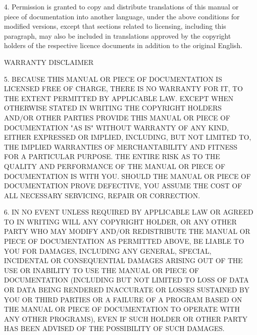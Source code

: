 4. Permission is granted to copy and distribute translations of this manual
or piece of documentation into another language, under the above conditions
for modified versions, except that sections related to licensing, including
this paragraph, may also be included in translations approved by the
copyright holders of the respective licence documents in addition to the
original English.

\begin{center}
WARRANTY DISCLAIMER
\end{center}

5. BECAUSE THIS MANUAL OR PIECE OF DOCUMENTATION IS LICENSED FREE OF
CHARGE, THERE IS NO WARRANTY FOR IT, TO THE EXTENT PERMITTED BY APPLICABLE
LAW.  EXCEPT WHEN OTHERWISE STATED IN WRITING THE COPYRIGHT HOLDERS AND/OR
OTHER PARTIES PROVIDE THIS MANUAL OR PIECE OF DOCUMENTATION "AS IS" WITHOUT
WARRANTY OF ANY KIND, EITHER EXPRESSED OR IMPLIED, INCLUDING, BUT NOT
LIMITED TO, THE IMPLIED WARRANTIES OF MERCHANTABILITY AND FITNESS FOR A
PARTICULAR PURPOSE.  THE ENTIRE RISK AS TO THE QUALITY AND PERFORMANCE OF
THE MANUAL OR PIECE OF DOCUMENTATION IS WITH YOU.  SHOULD THE MANUAL OR
PIECE OF DOCUMENTATION PROVE DEFECTIVE, YOU ASSUME THE COST OF ALL
NECESSARY SERVICING, REPAIR OR CORRECTION.

6. IN NO EVENT UNLESS REQUIRED BY APPLICABLE LAW OR AGREED TO IN WRITING
WILL ANY COPYRIGHT HOLDER, OR ANY OTHER PARTY WHO MAY MODIFY AND/OR
REDISTRIBUTE THE MANUAL OR PIECE OF DOCUMENTATION AS PERMITTED ABOVE, BE
LIABLE TO YOU FOR DAMAGES, INCLUDING ANY GENERAL, SPECIAL, INCIDENTAL OR
CONSEQUENTIAL DAMAGES ARISING OUT OF THE USE OR INABILITY TO USE THE MANUAL
OR PIECE OF DOCUMENTATION (INCLUDING BUT NOT LIMITED TO LOSS OF DATA OR
DATA BEING RENDERED INACCURATE OR LOSSES SUSTAINED BY YOU OR THIRD PARTIES
OR A FAILURE OF A PROGRAM BASED ON THE MANUAL OR PIECE OF DOCUMENTATION TO
OPERATE WITH ANY OTHER PROGRAMS), EVEN IF SUCH HOLDER OR OTHER PARTY HAS
BEEN ADVISED OF THE POSSIBILITY OF SUCH DAMAGES.
